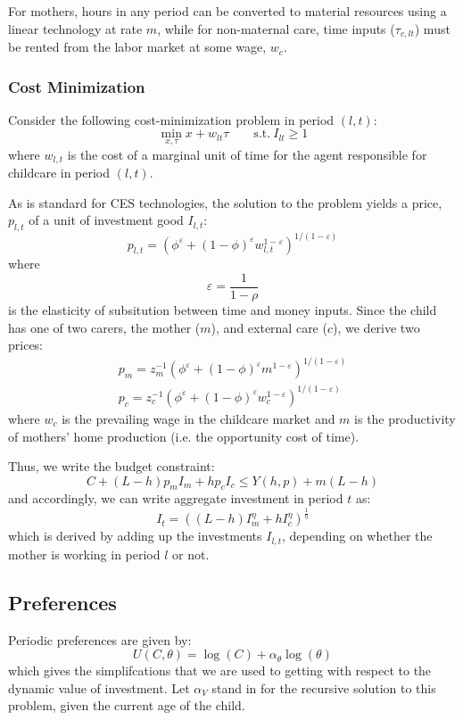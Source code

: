 \documentclass[12pt]{article}
\numberwithin{equation}{section}
\numberwithin{figure}{section}
\numberwithin{table}{section}
\begin{document}
For mothers, hours in any period can be converted to material resources using a linear technology at rate $m$, while for non-maternal care, time inputs ($\tau_{c,lt}$) must be rented from the labor market at some wage, $w_c$.

\subsubsection{Cost Minimization}
Consider the following cost-minimization problem in period $(l,t)$:
\[\min_{x,\tau}x+w_{lt}\tau\qquad\text{s.t.}\ I_{lt}\geq 1 \]
where $w_{l,t}$ is the cost of a marginal unit of time for the agent responsible for childcare in period $(l,t)$.

As is standard for CES technologies, the solution to the problem yields a price, $p_{l,t}$ of a unit of investment good $I_{l,t}$:
\[p_{l,t} = \left(\phi^\varepsilon + (1-\phi)^\varepsilon w_{l,t}^{1-\varepsilon}\right)^{1/(1-\varepsilon)} \]
where
\[ \varepsilon = \frac{1}{1-\rho} \]
is the elasticity of subsitution between time and money inputs. Since the child has one of two carers, the mother ($m$), and external care ($c$), we derive two prices:
\begin{eqnarray}
p_m = z_m^{-1}\left(\phi^\varepsilon + (1-\phi)^\varepsilon m^{1-\varepsilon}\right)^{1/(1-\varepsilon)} \\
p_c = z_c^{-1}\left(\phi^\varepsilon + (1-\phi)^\varepsilon w_c^{1-\varepsilon}\right)^{1/(1-\varepsilon)}
\end{eqnarray}
where $w_c$ is the prevailing wage in the childcare market and $m$ is the productivity of mothers' home production (i.e. the opportunity cost of time).

Thus, we write the budget constraint:
\[ C + (L-h)p_mI_m + hp_cI_c \leq Y(h,p) + m(L-h) \]
and accordingly, we can write aggregate investment in period $t$ as:
\[ I_t = \left((L-h)I_m^\eta + hI_c^\eta\right)^{\frac{1}{\eta}} \]
which is derived by adding up the investments $I_{l,t}$, depending on whether the mother is working in period $l$ or not.

\subsection{Preferences}
Periodic preferences are given by:
\[U(C,\theta) = \log(C) + \alpha_\theta\log(\theta) \]
which gives the simplifcations that we are used to getting with respect to the dynamic value of investment. Let $\alpha_V$ stand in for the recursive solution to this problem, given the current age of the child.
\end{document}
